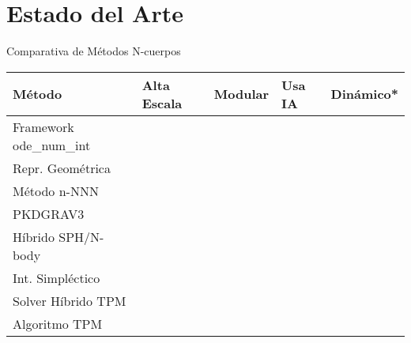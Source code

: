 \section{Estado del Arte}
\begin{frame}{Comparativa de Métodos N-cuerpos}
    \centering
    \label{tab:comparativa}
    \vspace{-0.1cm}
    \begin{adjustbox}{max width=1\textwidth,max height=0.35\textheight, keepaspectratio}
        \renewcommand{\arraystretch}{1.15}
            \begin{tabular}{>{
            \raggedright\arraybackslash}p{5.2cm}
            >{\centering\arraybackslash}p{3.2cm}
            >{\centering\arraybackslash}p{3.2cm}
            >{\centering\arraybackslash}p{3.2cm}
            >{\centering\arraybackslash}p{3.5cm}
            }
                \toprule
                \textbf{Método} & \textbf{Alta Escala} & \textbf{Modular} & \textbf{Usa IA} & \textbf{Dinámico*} \\
                \midrule
                Framework ode\_num\_int & \color{red}{\xmark} & \color{green}{\checkmark} & \color{red}{\xmark} & \color{red}{\xmark} \\
                \midrule
                Repr. Geométrica & \color{green}{\checkmark} & \color{red}{\xmark} & \color{red}{\xmark} & \color{red}{\xmark} \\
                \midrule
                Método n-NNN & \color{green}{\checkmark} & \color{red}{\xmark} & \color{green}{\checkmark} & \color{red}{\xmark} \\
                \midrule
                PKDGRAV3 & \color{green}{\checkmark} & \color{red}{\xmark} & \color{red}{\xmark} & \color{red}{\xmark} \\
                \midrule
                Híbrido SPH/N-body & \color{green}{\checkmark} & \color{green}{\checkmark} & \color{red}{\xmark} & \color{red}{\xmark} \\
                \midrule
                Int. Simpléctico & \color{red}{\xmark} & \color{green}{\checkmark} & \color{red}{\xmark} & \color{red}{\xmark} \\
                \midrule
                Solver Híbrido TPM & \color{green}{\checkmark} & \color{red}{\xmark} & \color{red}{\xmark} & \color{red}{\xmark} \\
                \midrule
                Algoritmo TPM & \color{green}{\checkmark} & \color{red}{\xmark} & \color{red}{\xmark} & \color{red}{\xmark} \\

\end{tabular}
\end{adjustbox}
\end{frame}
